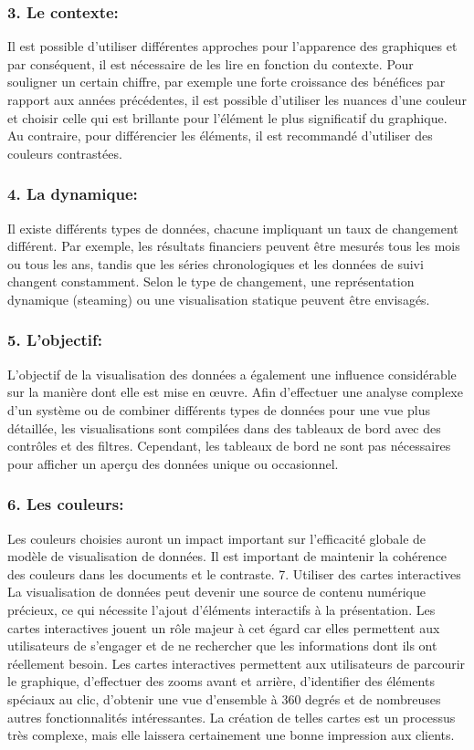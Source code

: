 \documentclass[french, a4paper, 12pt]{report}
\begin{document}
\subsubsection{3. Le contexte: }
Il est possible d’utiliser différentes approches pour l'apparence des graphiques et par conséquent, il est nécessaire de les lire en fonction du contexte. Pour souligner un certain chiffre, par exemple une forte croissance des bénéfices par rapport aux années précédentes, il est possible d’utiliser les nuances d’une couleur et choisir celle qui est brillante pour l’élément le plus significatif du graphique. Au contraire, pour différencier les éléments, il est recommandé d’utiliser des couleurs contrastées.
\subsubsection{4. La dynamique:  }
Il existe différents types de données, chacune impliquant un taux de changement différent. Par exemple, les résultats financiers peuvent être mesurés tous les mois ou tous les ans, tandis que les séries chronologiques et les données de suivi changent constamment. Selon le type de changement, une représentation dynamique (steaming) ou une visualisation statique peuvent être envisagés.
\subsubsection{5. L’objectif:  }
L’objectif de la visualisation des données a également une influence considérable sur la manière dont elle est mise en œuvre. Afin d'effectuer une analyse complexe d'un système ou de combiner différents types de données pour une vue plus détaillée, les visualisations sont compilées dans des tableaux de bord avec des contrôles et des filtres. Cependant, les tableaux de bord ne sont pas nécessaires pour afficher un aperçu des données unique ou occasionnel.
\subsubsection{6. Les couleurs: }
Les couleurs choisies auront un impact important sur l'efficacité globale de modèle de visualisation de données. Il est important de maintenir la cohérence des couleurs dans les documents et le contraste.
7. Utiliser des cartes interactives
La visualisation de données peut devenir une source de contenu numérique précieux, ce qui nécessite l'ajout d'éléments interactifs à la présentation. Les cartes interactives jouent un rôle majeur à cet égard car elles permettent aux utilisateurs de s’engager et de ne rechercher que les informations dont ils ont réellement besoin.
Les cartes interactives permettent aux utilisateurs de parcourir le graphique, d'effectuer des zooms avant et arrière, d'identifier des éléments spéciaux au clic, d'obtenir une vue d'ensemble à 360 degrés et de nombreuses autres fonctionnalités intéressantes. La création de telles cartes est un processus très complexe, mais elle laissera certainement une bonne impression aux clients.
\end{document}
